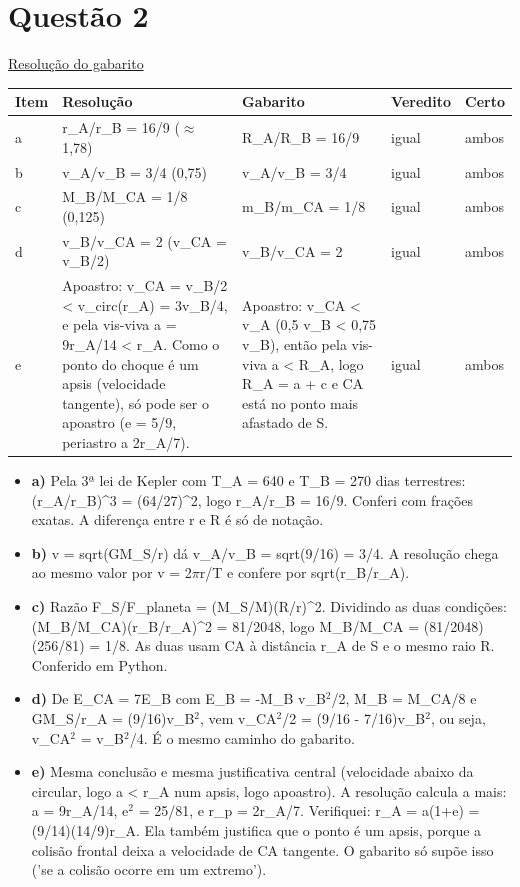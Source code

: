 \documentclass{article}%
\begin{document}
\section*{Questão 2}%
\href{https://poliedroresolve.sistemapoliedro.com.br/vestibulares/ime/2026/ime-2-fase-dia-2-24-10-2025-2-fase-dia-2/dissertativa-2-fisica-2-fase-dia-2-ime-2026}{Resolução do gabarito}\par\smallskip%
\begin{longtable}{@{}p{} p{} p{} p{} p{}@{}}\toprule Item & Resolução & Gabarito & Veredito & Certo \\ \midrule
a & r\_A/r\_B = 16/9 ($\approx$ 1,78) & R\_A/R\_B = 16/9 & igual & ambos \\
b & v\_A/v\_B = 3/4 (0,75) & v\_A/v\_B = 3/4 & igual & ambos \\
c & M\_B/M\_CA = 1/8 (0,125) & m\_B/m\_CA = 1/8 & igual & ambos \\
d & v\_B/v\_CA = 2 (v\_CA = v\_B/2) & v\_B/v\_CA = 2 & igual & ambos \\
e & Apoastro: v\_CA = v\_B/2 < v\_circ(r\_A) = 3v\_B/4, e pela vis{-}viva a = 9r\_A/14 < r\_A. Como o ponto do choque é um apsis (velocidade tangente), só pode ser o apoastro (e = 5/9, periastro a 2r\_A/7). & Apoastro: v\_CA < v\_A (0,5 v\_B < 0,75 v\_B), então pela vis{-}viva a < R\_A, logo R\_A = a + c e CA está no ponto mais afastado de S. & igual & ambos \\
\bottomrule\end{longtable}%
\begin{itemize}%
\item%
\textbf{a)} Pela 3ª lei de Kepler com T\_A = 640 e T\_B = 270 dias terrestres: (r\_A/r\_B)\^{}3 = (64/27)\^{}2, logo r\_A/r\_B = 16/9. Conferi com frações exatas. A diferença entre r e R é só de notação.%
\item%
\textbf{b)} v = sqrt(GM\_S/r) dá v\_A/v\_B = sqrt(9/16) = 3/4. A resolução chega ao mesmo valor por v = 2$\pi$r/T e confere por sqrt(r\_B/r\_A).%
\item%
\textbf{c)} Razão F\_S/F\_planeta = (M\_S/M)(R/r)\^{}2. Dividindo as duas condições: (M\_B/M\_CA)(r\_B/r\_A)\^{}2 = 81/2048, logo M\_B/M\_CA = (81/2048)(256/81) = 1/8. As duas usam CA à distância r\_A de S e o mesmo raio R. Conferido em Python.%
\item%
\textbf{d)} De E\_CA = 7E\_B com E\_B = {-}M\_B v\_B$^2$/2, M\_B = M\_CA/8 e GM\_S/r\_A = (9/16)v\_B$^2$, vem v\_CA$^2$/2 = (9/16 {-} 7/16)v\_B$^2$, ou seja, v\_CA$^2$ = v\_B$^2$/4. É o mesmo caminho do gabarito.%
\item%
\textbf{e)} Mesma conclusão e mesma justificativa central (velocidade abaixo da circular, logo a < r\_A num apsis, logo apoastro). A resolução calcula a mais: a = 9r\_A/14, e$^2$ = 25/81, e r\_p = 2r\_A/7. Verifiquei: r\_A = a(1+e) = (9/14)(14/9)r\_A. Ela também justifica que o ponto é um apsis, porque a colisão frontal deixa a velocidade de CA tangente. O gabarito só supõe isso ('se a colisão ocorre em um extremo').%
\end{itemize}%
\end{document}
